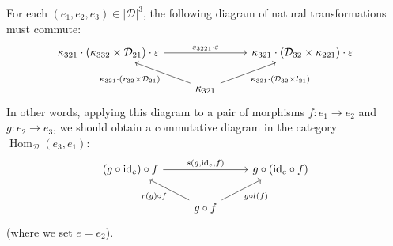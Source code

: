 \documentclass{article}
\newcommand{\oldpage}[1]{\marginpar{\footnotesize$\Big\vert$ \textit{p.~#1}}}
\newcommand{\id}{\mathrm{id}}
\newcommand{\cat}[1]{\mathcal{#1}}
\newcommand{\set}[1]{|#1|}
\DeclareMathOperator{\Hom}{Hom}
\begin{document}
\begin{enumerate}
    For each $(e_1,e_2,e_3)\in\set{\cat{D}}^3$, the following diagram of natural transformations must commute:
    \oldpage{245}
    \[
      \begin{tikzcd}
        \kappa_{321}\cdot(\kappa_{332}\times\cat{D}_{21})\cdot\varepsilon
          \ar[rr,"s_{3221}\cdot\varepsilon"]
      &&\kappa_{321}\cdot(\cat{D}_{32}\times\kappa_{221})\cdot\varepsilon
      \\&\kappa_{321}
          \ar[ul,"\kappa_{321}\cdot(r_{32}\times\cat{D}_{21})"]
          \ar[ur,swap,"\kappa_{321}\cdot(\cat{D}_{32}\times l_{21})"]
      \end{tikzcd}
    \]
    In other words, applying this diagram to a pair of morphisms $f\colon e_1\to e_2$ and $g\colon e_2\to e_3$, we should obtain a commutative diagram in the category $\Hom_\cat{D}(e_3,e_1)$:
    \[
      \begin{tikzcd}
        (g\circ\id_e)\circ f
          \ar[rr,"{s(g,\id_e,f)}"]
      &&g\circ(\id_e\circ f)
      \\
      & g\circ f
          \ar[ul,"{r(g)\circ f}"]
          \ar[ur,swap,"{g\circ l(f)}"]
      \end{tikzcd}
    \]
    (where we set $e=e_2$).


\end{enumerate}
\end{document}

